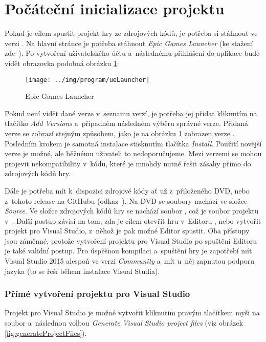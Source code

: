 
\section{Počáteční inicializace projektu}

Pokud je cílem spustit projekt hry ze zdrojových kódů, je potřeba si stáhnout \UE{} ve verzi . Na hlavní stránce \UE{} je potřeba stáhnout \textit{Epic Games Launcher} (ke stažení zde~\citep{ue_download}). Po vytvoření uživatelského účtu a~následnému přihlášení do aplikace bude vidět obrazovka podobná obrázku \ref{fig:ueLauncher}:


\begin{figure}[!ht]\centering
\texttt{[image: ../img/program/ueLauncher]}

\caption{Epic Games Launcher}
\label{fig:ueLauncher}

\end{figure}

\FloatBarrier

Pokud není vidět \UE{} dané verze v~seznamu verzí, je potřeba jej přidat kliknutím na tlačítko \textit{Add Versions} a~případném následném výběru správné verze. Přidaná verze se zobrazí stejným způsobem, jako je na obrázku \ref{fig:ueLauncher} zobrazen \UE{} verze . Posledním krokem je samotná instalace stisknutím tlačítka \textit{Install}. Použití novější verze \UEu{} je možné, ale běžnému uživateli to nedoporučujeme. Mezi verzemi se mohou projevit nekompatibility v~kódu, které je mnohdy nutné řešit zásahy přímo do zdrojových kódů hry.

Dále je potřeba mít k~dispozici zdrojové kódy ať už z~přiloženého DVD, nebo z~tohoto release na GitHubu (odkaz~\citep{gh_finalRelease}). Na DVD se soubory nachází ve složce \textit{Source}. Ve složce zdrojových kódů hry se nachází soubor , což je soubor projektu v~\UEu{}. Další postup závisí na tom, zda je cílem otevřít hru v~Editoru \UEu{}, nebo vytvořit projekt pro Visual Studio, z~něhož je pak možné Editor spustit. Oba přístupy jsou záměnné, protože vytvoření projektu pro Visual Studio po spuštění Editoru je také validní postup. Pro úspěšnou kompilaci a~spuštění hry je zapotřebí mít Visual Studio 2015 alespoň ve verzi \textit{Community} a~mít u~něj zapnutou podporu jazyka \CPP{} (to se řeší během instalace Visual Studia).
 
\subsubsection{Přímé vytvoření projektu pro Visual Studio}
Projekt pro Visual Studio je možné vytvořit kliknutím pravým tlačítkem myši na soubor  a~následnou volbou \textit{Generate Visual Studio project files} (viz obrázek \ref{fig:generateProjectFiles}). 

